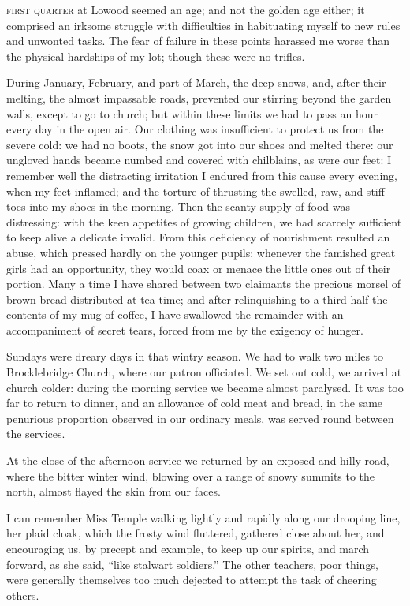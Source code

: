 
 \textsc{first quarter} at Lowood seemed an age; and not the golden age either;
it comprised an irksome struggle with difficulties in habituating myself
to new rules and unwonted tasks. The fear of failure in these points
harassed me worse than the physical hardships of my lot; though these
were no trifles.

During January, February, and part of March, the deep snows, and, after
their melting, the almost impassable roads, prevented our stirring
beyond the garden walls, except to go to church; but within these limits
we had to pass an hour every day in the open air. Our clothing was
insufficient to protect us from the severe cold: we had no boots, the
snow got into our shoes and melted there: our ungloved hands became
numbed and covered with chilblains, as were our feet: I remember well
the distracting irritation I endured from this cause every evening, when
my feet inflamed; and the torture of thrusting the swelled, raw, and
stiff toes into my shoes in the morning. Then the scanty supply of food
was distressing: with the keen appetites of growing children, we had
scarcely sufficient to keep alive a delicate invalid. From this
deficiency of nourishment resulted an abuse, which pressed hardly on the
younger pupils: whenever the famished great girls had an opportunity,
they would coax or menace the little ones out of their portion. Many a
time I have shared between two claimants the precious morsel of brown
bread distributed at tea-time; and after relinquishing to a third half
the contents of my mug of coffee, I have swallowed the remainder with an
accompaniment of secret tears, forced from me by the exigency of hunger.

Sundays were dreary days in that wintry season. We had to walk two
miles to Brocklebridge Church, where our patron officiated. We set out
cold, we arrived at church colder: during the morning service we became
almost paralysed. It was too far to return to dinner, and an allowance
of cold meat and bread, in the same penurious proportion observed in our
ordinary meals, was served round between the services.

At the close of the afternoon service we returned by an exposed and
hilly road, where the bitter winter wind, blowing over a range of snowy
summits to the north, almost flayed the skin from our faces.

I can remember Miss Temple walking lightly and rapidly along our
drooping line, her plaid cloak, which the frosty wind fluttered,
gathered close about her, and encouraging us, by precept and example, to
keep up our spirits, and march forward, as she said, \enquote{like
	stalwart soldiers.} The other teachers, poor things, were generally
themselves too much dejected to attempt the task of cheering others.

